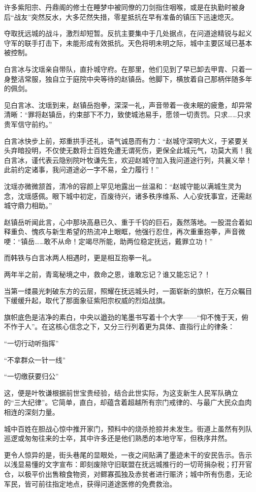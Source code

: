 许多紫阳宗、丹鼎阁的修士在睡梦中被同僚的刀剑指住咽喉，或是在执勤时被身后“战友”突然反水，大多茫然失措，零星抵抗在早有准备的镇压下迅速熄灭。

夺取抚远城的战斗，激烈却短暂。反抗主要集中于几处据点，在问道途精锐与起义守军的联手打击下，未能形成有效抵抗。天色将明未明之际，城中主要区域已基本被控制。

白言冰与沈瑶亲自带队，直扑城守府。在那里，他们见到了早已卸去甲胄、只着一身整洁常服，独自立于庭院中央等待的赵镇岳。他脚下，横放着自己那柄伴随多年的佩剑。

见白言冰、沈瑶到来，赵镇岳抱拳，深深一礼，声音带着一夜未眠的疲惫，却异常清晰：“罪将赵镇岳，约束部下不力，致使城池易手，愿领一切责罚。只求……只求贵军信守前约。”

白言冰快步上前，郑重拱手还礼，语气诚恳而有力：“赵城守深明大义，于紧要关头弃暗投明，不仅使无数将士百姓免遭无谓死伤，更保全此城元气，功莫大焉！我白言冰，谨代表云隐别院叶牧谦先生，欢迎赵城守加入我问道途行列，共襄义举！此前约定诸事，我问道途必一字不易，全力履行！”

沈瑶亦微微颔首，清冷的容颜上罕见地露出一丝温和：“赵城守能以满城生灵为念，沈瑶感佩。眼下城中初定，百废待兴，诸多秩序维系、人心安抚事宜，还需赵城守鼎力相助。”

赵镇岳听闻此言，心中那块高悬已久、重于千钧的巨石，轰然落地。一股混合着如释重负、愧疚与新生希望的热流冲上眼眶，他强行忍住，再次重重抱拳，声音微哽：“镇岳……敢不从命！定竭尽所能，助两位稳定抚远，戴罪立功！”

而韩铁与白言冰两人相遇时，更是相互抱拳一礼。

两年半之前，青鸾秘境之中，救命之恩，谁敢忘记？谁又能忘记？！

当第一缕晨光刺破东方的云层，照耀在抚远城头时，一面崭新的旗帜，在万众瞩目下缓缓升起，取代了那面象征紫阳宗权威的烈焰战旗。

旗帜底色是洁净的素白，中央以遒劲的笔墨书写着十个大字——“仰不愧于天，俯不怍于人”。在这核心信念之下，又分三行列着更为具体、直指行止的律条：

“一切行动听指挥”

“不拿群众一针一线”

“一切缴获要归公”

这，便是叶牧谦根据前世宝贵经验，结合此世实际，为这支新生人民军队确立的“三大纪律”。它简单，直白，却蕴含着超越所有宗门戒律的、与最广大民众血肉相连的深刻力量。

城中百姓在胆战心惊中推开家门，预料中的烧杀抢掠并未发生。街道上虽然有列队巡逻或匆匆往来的士卒，其中许多还是他们熟悉的本地守军，但秩序井然。

更令人惊异的是，街头巷尾的显眼处，一夜之间贴满了墨迹未干的安民告示。告示以浅显易懂的文字宣布：即刻废除守旧联盟在抚远城推行的一切苛捐杂税；打开官仓，以极平价出售粮食物资，对鳏寡孤独及赤贫者进行赈济；城中所有伤患，无论军民，皆可前往指定地点，获得问道途医修的免费救治。

